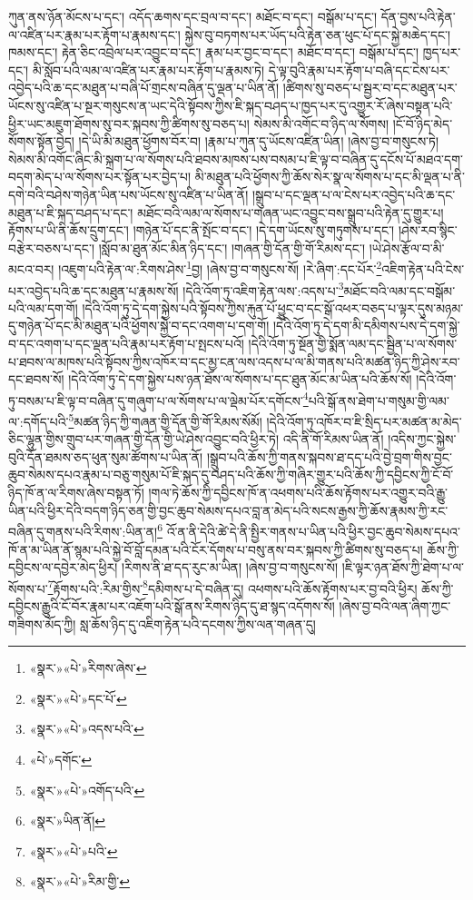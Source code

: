 ཀུན་ནས་ཉོན་མོངས་པ་དང་། འདོད་ཆགས་དང་བྲལ་བ་དང་། མཐོང་བ་དང་། བསྒོམ་པ་དང་། དོན་བྱས་པའི་རྟེན་ལ་འཛིན་པར་རྣམ་པར་རྟོག་པ་རྣམས་དང་། སྐྱེས་བུ་བཏགས་པར་ཡོད་པའི་རྟེན་ཅན་ཕུང་པོ་དང་སྐྱེ་མཆེད་དང་། ཁམས་དང་། རྟེན་ཅིང་འབྲེལ་པར་འབྱུང་བ་དང་། རྣམ་པར་བྱང་བ་དང་། མཐོང་བ་དང་། བསྒོམ་པ་དང་། ཁྱད་པར་དང་། མི་སློབ་པའི་ལམ་ལ་འཛིན་པར་རྣམ་པར་རྟོག་པ་རྣམས་ཏེ། དེ་ལྟ་བུའི་རྣམ་པར་རྟོག་པ་བཞི་དང་ངེས་པར་འབྱེད་པའི་ཆ་དང་མཐུན་པ་བཞི་པོ་གྲངས་བཞིན་དུ་ལྡན་པ་ཡིན་ནོ། །ཚིགས་སུ་བཅད་པ་སྦྱར་བ་དང་མཐུན་པར་ཡོངས་སུ་འཛིན་པ་སྔར་གསུངས་ན་ཡང་དེའི་སྟོབས་ཀྱིས་ཇི་སྐད་བཤད་པ་ཁྱད་པར་དུ་འགྱུར་རོ་ཞེས་བསྟན་པའི་ཕྱིར་ཡང་མཇུག་ཐོགས་སུ་བར་སྐབས་ཀྱི་ཚིགས་སུ་བཅད་པ། སེམས་མི་འགོང་བ་ཉིད་ལ་སོགས། །ངོ་བོ་ཉིད་མེད་སོགས་སྟོན་བྱེད། །དེ་ཡི་མི་མཐུན་ཕྱོགས་བོར་བ། །རྣམ་པ་ཀུན་དུ་ཡོངས་འཛིན་ཡིན། །ཞེས་བྱ་བ་གསུངས་ཏེ། སེམས་མི་འགོང་ཞིང་མི་སྐྲག་པ་ལ་སོགས་པའི་ཐབས་མཁས་པས་བསམ་པ་ཇི་ལྟ་བ་བཞིན་དུ་དངོས་པོ་མཐའ་དག་བདག་མེད་པ་ལ་སོགས་པར་སྟོན་པར་བྱེད་པ། མི་མཐུན་པའི་ཕྱོགས་ཀྱི་ཆོས་སེར་སྣ་ལ་སོགས་པ་དང་མི་ལྡན་པ་ནི་དགེ་བའི་བཤེས་གཉེན་ཡིན་པས་ཡོངས་སུ་འཛིན་པ་ཡིན་ནོ། །སྒྲུབ་པ་དང་ལྡན་པ་ལ་ངེས་པར་འབྱེད་པའི་ཆ་དང་མཐུན་པ་ཇི་སྐད་བཤད་པ་དང་། མཐོང་བའི་ལམ་ལ་སོགས་པ་གཞན་ཡང་འབྱུང་བས་སྒྲུབ་པའི་རྟེན་དུ་གྱུར་པ། རྟོགས་པ་ཡི་ནི་ཆོས་དྲུག་དང་། །གཉེན་པོ་དང་ནི་སྤོང་བ་དང་། །དེ་དག་ཡོངས་སུ་གཏུགས་པ་དང་། །ཤེས་རབ་སྙིང་བརྩེར་བཅས་པ་དང་། །སློབ་མ་ཐུན་མོང་མིན་ཉིད་དང་། །གཞན་གྱི་དོན་གྱི་གོ་རིམས་དང་། །ཡེ་ཤེས་རྩོལ་བ་མི་མངའ་བར། །འཇུག་པའི་རྟེན་ལ་:རིགས་ཤེས་\footnote{«སྣར་»«པེ་»རིགས་ཞེས་}བྱ། །ཞེས་བྱ་བ་གསུངས་སོ། །རེ་ཞིག་:དང་པོར་\footnote{«སྣར་»«པེ་»དང་པོ་}འཇིག་རྟེན་པའི་ངེས་པར་འབྱེད་པའི་ཆ་དང་མཐུན་པ་རྣམས་སོ། །དེའི་འོག་ཏུ་འཇིག་རྟེན་ལས་:འདས་པ་\footnote{«སྣར་»«པེ་»འདས་པའི་}མཐོང་བའི་ལམ་དང་བསྒོམ་པའི་ལམ་དག་གོ། །དེའི་འོག་ཏུ་དེ་དག་སྐྱེས་པའི་སྟོབས་ཀྱིས་རྐུན་པོ་ཕྱུང་བ་དང་སྒོ་འཕར་བཅད་པ་ལྟར་དུས་མཉམ་དུ་གཉེན་པོ་དང་མི་མཐུན་པའི་ཕྱོགས་སྐྱེ་བ་དང་འགག་པ་དག་གོ། །དེའི་འོག་ཏུ་དེ་དག་མི་དམིགས་པས་དེ་དག་སྐྱེ་བ་དང་འགག་པ་དང་ལྡན་པའི་རྣམ་པར་རྟོག་པ་སྤངས་པའོ། །དེའི་འོག་ཏུ་སྔོན་གྱི་སྨོན་ལམ་དང་སྦྱིན་པ་ལ་སོགས་པ་ཐབས་ལ་མཁས་པའི་སྟོབས་ཀྱིས་འཁོར་བ་དང་མྱ་ངན་ལས་འདས་པ་ལ་མི་གནས་པའི་མཚན་ཉིད་ཀྱི་ཤེས་རབ་དང་ཐབས་སོ། །དེའི་འོག་ཏུ་དེ་དག་སྐྱེས་པས་ཉན་ཐོས་ལ་སོགས་པ་དང་ཐུན་མོང་མ་ཡིན་པའི་ཆོས་སོ། །དེའི་འོག་ཏུ་བསམ་པ་ཇི་ལྟ་བ་བཞིན་དུ་གཞུག་པ་ལ་སོགས་པ་ལ་ལྡེམ་པོར་དགོངས་\footnote{«པེ་»དགོང་}པའི་སྒོ་ནས་ཐེག་པ་གསུམ་གྱི་ལམ་ལ་:དགོད་པའི་\footnote{«སྣར་»«པེ་»འགོད་པའི་}མཚན་ཉིད་ཀྱི་གཞན་གྱི་དོན་གྱི་གོ་རིམས་སོམོ། །དེའི་འོག་ཏུ་འཁོར་བ་ཇི་སྲིད་པར་མཚན་མ་མེད་ཅིང་ལྷུན་གྱིས་གྲུབ་པར་གཞན་གྱི་དོན་གྱི་ཡེ་ཤེས་འབྱུང་བའི་ཕྱིར་ཏེ། འདི་ནི་གོ་རིམས་ཡིན་ནོ། །འདིས་ཀྱང་སྐྱེས་བུའི་དོན་ཐམས་ཅད་ཕུན་སུམ་ཚོགས་པ་ཡིན་ནོ། །སྒྲུབ་པའི་ཆོས་ཀྱི་གནས་སྐབས་ཐ་དད་པའི་བྱེ་བྲག་གིས་བྱང་ཆུབ་སེམས་དཔའ་རྣམ་པ་བཅུ་གསུམ་པོ་ཇི་སྐད་དུ་བཤད་པའི་ཆོས་ཀྱི་གཞིར་གྱུར་པའི་ཆོས་ཀྱི་དབྱིངས་ཀྱི་ངོ་བོ་ཉིད་ཁོ་ན་ལ་རིགས་ཞེས་བསྟན་ཏོ། །གལ་ཏེ་ཆོས་ཀྱི་དབྱིངས་ཁོ་ན་འཕགས་པའི་ཆོས་རྟོགས་པར་འགྱུར་བའི་རྒྱུ་ཡིན་པའི་ཕྱིར་དེའི་བདག་ཉིད་ཅན་གྱི་བྱང་ཆུབ་སེམས་དཔའ་བླ་ན་མེད་པའི་སངས་རྒྱས་ཀྱི་ཆོས་རྣམས་ཀྱི་རང་བཞིན་དུ་གནས་པའི་རིགས་:ཡིན་ན།\footnote{«སྣར་»ཡིན་ནོ།} འོ་ན་ནི་དེའི་ཚེ་དེ་ནི་སྤྱིར་གནས་པ་ཡིན་པའི་ཕྱིར་བྱང་ཆུབ་སེམས་དཔའ་ཁོ་ན་མ་ཡིན་ནོ་སྙམ་པའི་སྐྱེ་བོ་བློ་དམན་པའི་ངོར་དོགས་པ་བསུ་ནས་བར་སྐབས་ཀྱི་ཚིགས་སུ་བཅད་པ། ཆོས་ཀྱི་དབྱིངས་ལ་དབྱེར་མེད་ཕྱིར། །རིགས་ནི་ཐ་དད་རུང་མ་ཡིན། །ཞེས་བྱ་བ་གསུངས་སོ། །ཇི་ལྟར་ཉན་ཐོས་ཀྱི་ཐེག་པ་ལ་སོགས་པ་\footnote{«སྣར་»«པེ་»པའི་}རྟོགས་པའི་:རིམ་གྱིས་\footnote{«སྣར་»«པེ་»རིམ་གྱི་}དམིགས་པ་དེ་བཞིན་དུ། འཕགས་པའི་ཆོས་རྟོགས་པར་བྱ་བའི་ཕྱིར། ཆོས་ཀྱི་དབྱིངས་རྒྱུའི་ངོ་བོར་རྣམ་པར་འཇོག་པའི་སྒོ་ནས་རིགས་ཉིད་དུ་ཐ་སྙད་འདོགས་སོ། །ཞེས་བྱ་བའི་ལན་ཞིག་ཀྱང་གཟིགས་མོད་ཀྱི། སླ་ཆོས་ཉིད་དུ་འཇིག་རྟེན་པའི་དངགས་ཀྱིས་ལན་གཞན་དུ། 